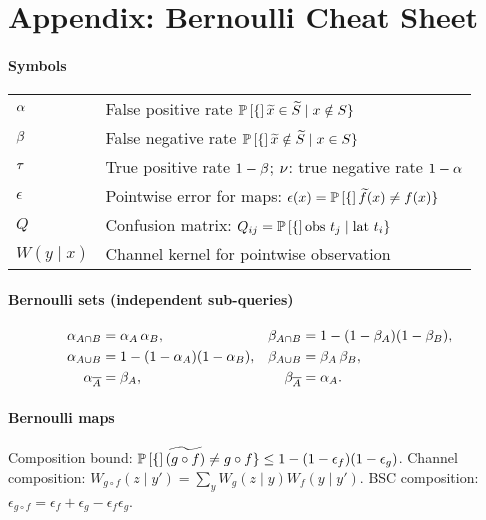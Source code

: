 \section*{Appendix: Bernoulli Cheat Sheet}

\paragraph{Symbols}
\begin{tabular}{@{}ll@{}}
$\alpha$ & False positive rate $\mathbb{P}\left[\{\right]\widetilde{x}\in\widetilde{S}\mid x\notin S\}$ \\
$\beta$ & False negative rate $\mathbb{P}\left[\{\right]\widetilde{x}\notin\widetilde{S}\mid x\in S\}$ \\
$\tau$ & True positive rate $1-\beta$; $\nu$: true negative rate $1-\alpha$ \\
$\epsilon$ & Pointwise error for maps: $\epsilon(x)=\mathbb{P}\left[\{\right]\widetilde{f}(x)\neq f(x)\}$ \\
$Q$ & Confusion matrix: $Q_{ij}=\mathbb{P}\left[\{\right]\text{obs } t_j\mid \text{lat } t_i\}$ \\
$W(y\mid x)$ & Channel kernel for pointwise observation \\
\end{tabular}

\paragraph{Bernoulli sets (independent sub-queries)}
\begin{align*}
\alpha_{A\cap B} &= \alpha_A\,\alpha_B, & \beta_{A\cap B} &= 1-(1-\beta_A)(1-\beta_B), \\
\alpha_{A\cup B} &= 1-(1-\alpha_A)(1-\alpha_B), & \beta_{A\cup B} &= \beta_A\,\beta_B, \\
\alpha_{\overline{A}} &= \beta_A, & \beta_{\overline{A}} &= \alpha_A.
\end{align*}

\paragraph{Bernoulli maps}
Composition bound: $\mathbb{P}\left[\{\right]\widetilde{(g\circ f)}\neq g\circ f\} \le 1-(1-\epsilon_f)(1-\epsilon_g)$.  
Channel composition: $W_{g\circ f}(z\mid y')=\sum_y W_g(z\mid y)W_f(y\mid y')$.  
BSC composition: $\epsilon_{g\circ f}=\epsilon_f+\epsilon_g-\epsilon_f\epsilon_g$.

